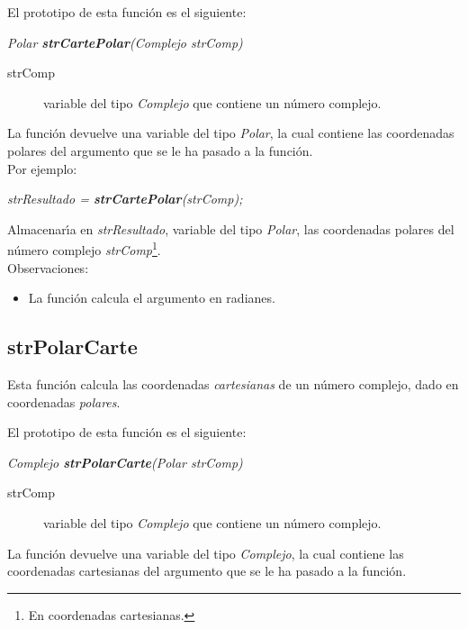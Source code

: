 El prototipo de esta funci\'on es el siguiente:

\begin{center}
\emph{Polar \textbf{strCartePolar}(Complejo strComp)}
\end{center}

\begin{description}
\item[strComp] variable del tipo \emph{Complejo} que contiene un n\'umero 
complejo.
\end{description}

La funci\'on devuelve una variable del tipo \emph{Polar}, la cual contiene
las coordenadas polares del argumento que se le ha pasado a la funci\'on.\\

Por ejemplo:

\begin{center}
\emph{strResultado = \textbf{strCartePolar}(strComp);}
\end{center}

Almacenar\'{\i}a en \emph{strResultado}, variable del tipo \emph{Polar}, las
coordenadas polares del n\'umero complejo \emph{strComp}\footnote{En coordenadas
cartesianas.}.\\

Observaciones:

\begin{itemize}
\item La funci\'on calcula el argumento en radianes.
\end{itemize}

\subsection{strPolarCarte}
Esta funci\'on calcula las coordenadas \emph{cartesianas} de un n\'umero
complejo, dado en coordenadas \emph{polares}.\newline

El prototipo de esta funci\'on es el siguiente:

\begin{center}
\emph{Complejo \textbf{strPolarCarte}(Polar strComp)}
\end{center}

\begin{description}
\item[strComp] variable del tipo \emph{Complejo} que contiene un n\'umero 
complejo.
\end{description}

La funci\'on devuelve una variable del tipo \emph{Complejo}, la cual contiene
las coordenadas cartesianas del argumento que se le ha pasado a la funci\'on.


